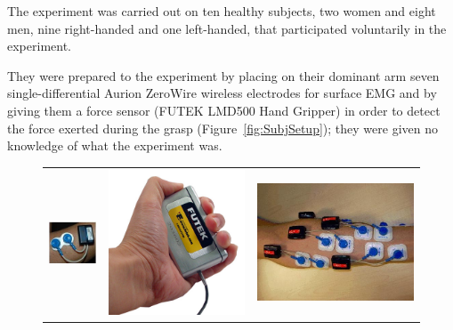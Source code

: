 The experiment was carried out on ten healthy subjects, two women and eight men, nine right-handed and one left-handed, that participated voluntarily in the experiment.

They were prepared to the experiment by placing on their dominant arm seven single-differential Aurion ZeroWire wireless electrodes for surface EMG and by giving them a force sensor (FUTEK LMD500 Hand Gripper) in order to detect the force exerted during the grasp (Figure~\ref{fig:SubjSetup}); they were given no knowledge of what the experiment was.

\begin{figure}[!t] \centering
  \begin{tabular}{ccc}
   \includegraphics[height=0.16\textheight]{figs/Electrode} &
    \includegraphics[height=0.16\textheight]{figs/Hand_Gripper} &
    \includegraphics[height=0.16\textheight]{figs/El_Arrangement} \\

\end{tabular}
\end{figure}
